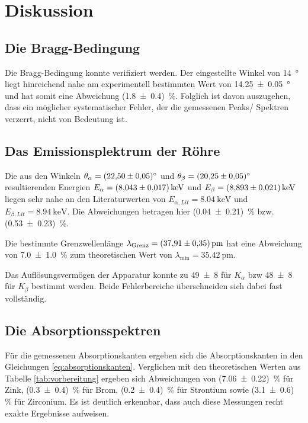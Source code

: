 \section{Diskussion}

\subsection{Die Bragg-Bedingung}
Die Bragg-Bedingung konnte verifiziert werden.
Der eingestellte Winkel von \qty[]{14}{\degree} liegt hinreichend nahe am experimentell bestimmten Wert von \qty{14.25+-0.05}{\degree}
und hat somit eine Abweichung (\num[]{1.8 +- 0.4}) \,\%.
Folglich ist davon auszugehen, dass ein möglicher systematischer Fehler, der die gemessenen Peaks/ Spektren verzerrt, nicht von Bedeutung ist.


\subsection{Das Emissionsplektrum der Röhre}
Die aus den Winkeln $\theta_\alpha = \qty{22.50 \pm 0.05}{\degree}$ und $\theta_\beta = \qty{20.25 \pm 0.05}{\degree}$
 resultierenden Energien $E_\alpha = \qty{8.043 \pm 0.017}{\kilo\eV}$ und $E_\beta  = \qty{8.893 \pm 0.021}{\kilo\eV}$
liegen sehr nahe an den Literaturwerten von $E_{\alpha,Lit} = \qty[]{8.04}{\kilo\electronvolt}$ und
$E_{\beta,Lit} = \qty[]{8.94}{\kilo\electronvolt}$.
Die Abweichungen betragen hier (\num[]{0.04 +- 0.21}) \,\% bzw. (\num[]{0.53 +- 0.23}) \,\%.

\noindent
Die bestimmte Grenzwellenlänge $\lambda_\text{Grenz}  = \qty{37.91 \pm 0.35}{\pico\meter}$ hat eine Abweichung von \num[]{7.0 +- 1.0} \,\%
zum theoretischen Wert von $\lambda_\text{min}= \qty{35.42}{\pico\m}$.

\noindent
Das Auflösungsvermögen der Apparatur konnte zu \num[]{49 +- 8} für $K_\alpha$ bzw \num[]{48 +- 8} für $K_\beta$
bestimmt werden.
Beide Fehlerbereiche überschneiden sich dabei fast vollständig.





\subsection{Die Absorptionsspektren}
Für die gemessenen Absorptionskanten ergeben sich die Absorptionskanten in den Gleichungen \eqref{eq:absorptionskanten}.
Verglichen mit den theoretischen Werten aus Tabelle \ref{tab:vorbereitung} ergeben sich Abweichungen von (\num[]{7.06 +- 0.22}) \,\% für Zink,
(\num[]{0.3 +- 0.4}) \,\% für Brom, (\num[]{0.2 +- 0.4}) \,\% für Strontium sowie (\num[]{3.1 +- 0.6}) \,\% für Zirconium.
Es ist deutlich erkennbar, dass auch diese Messungen recht exakte Ergebnisse aufweisen.

